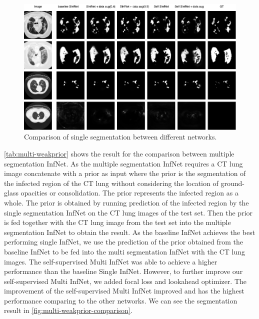  \begin{figure}
 	\includegraphics[width=\linewidth]{comparison_single.png}
 	\caption{Comparison of single segmentation between different networks.}
 	\label{fig:single-comparison}
 \end{figure}

 \ref{tab:multi-weakprior} shows the result for the comparison between multiple segmentation InfNet. As the multiple segmentation InfNet requires a CT lung image concatenate with a prior as input where the prior is the segmentation of the infected region of the CT lung without considering the location of ground-glass opacities or consolidation. The prior represents the infected region as a whole. The prior is obtained by running prediction of the infected region by the single segmentation InfNet on the CT lung images of the test set. Then the prior is fed together with the CT lung image from the test set into the multiple segmentation InfNet to obtain the result. As the baseline InfNet achieves the best performing single InfNet, we use the prediction of the prior obtained from the baseline InfNet to be fed into the multi segmentation InfNet with the CT lung images. The self-supervised Multi InfNet was able to achieve a higher performance than the baseline Single InfNet. However, to further improve our self-supervised Multi InfNet, we added focal loss and lookahead optimizer. The improvement of the self-supervised Multi InfNet improved and has the highest performance comparing to the other networks. We can see the segmentation result in \ref{fig:multi-weakprior-comparison}.  
 

